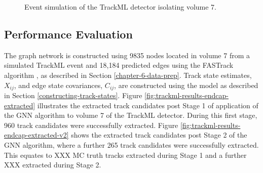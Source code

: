 \begin{figure}[htbp!] 
    \centering
    \hfill%
    \caption{Event simulation of the TrackML detector isolating volume 7.}
    \label{fig:trackml-results-endcap-nodes-sim}
\end{figure}



\subsection{Performance Evaluation}

The graph network is constructed using 9835 nodes located in volume 7 from a simulated TrackML event and 18,184 predicted edges using the FASTrack algorithm \cite{Dmitry-fasttrack-addtest}, as described in Section \ref{chapter-6-data-prep}. Track state estimates, $X_{ij}$, and edge state covariances, $C_{ij}$, are constructed using the model as described in Section \ref{constructing-track-states}. Figure \ref{fig:trackml-results-endcap-extracted} illustrates the extracted track candidates post Stage 1 of application of the GNN algorithm to volume 7 of the TrackML detector. During this first stage, 960 track candidates were successfully extracted. Figure \ref{fig:trackml-results-endcap-extracted-v2} shows the extracted track candidates post Stage 2 of the GNN algorithm, where a further 265 track candidates were successfully extracted. This equates to XXX MC truth tracks extracted during Stage 1 and a further XXX extracted during Stage 2.


